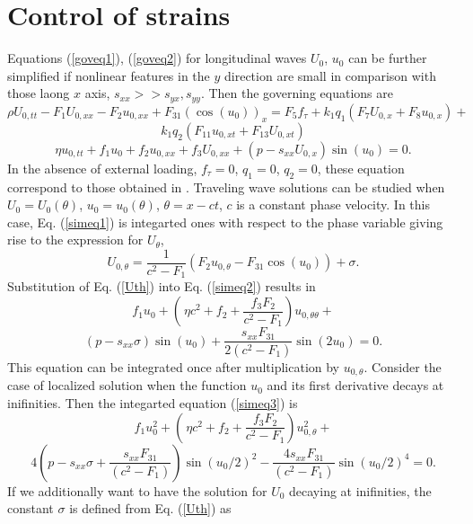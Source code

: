 \section{Control of strains}
Equations (\ref{goveq1}), (\ref{goveq2}) for longitudinal waves $U_0$, $u_0$ can be further simplified if nonlinear features in the $y$ direction are small in comparison with those laong $x$ axis, $s_{xx}>>s_{yx}, s_{yy}$. Then the governing equations are 
\[
\rho U_{0,tt}-F_1 U_{0,xx}-F_2 u_{0,xx}+F_{31} ( \cos(u_0))_x= F_5 f_\tau+k_1 q_1 (F_7 U_{0,x}+F_8 u_{0,x})+
\]
\begin{equation}
	k_1 q_2 (F_{11} u_{0,xt}+ F_{13} U_{0,xt}) \label{simeq1}
\end{equation}
\begin{equation}
	\eta u_{0,tt}+f_1 u_0+f_2 u_{0,xx}+f_3 U_{0,xx}+(p-s_{xx} U_{0,x})\sin(u_0)=0.  \label{simeq2}
\end{equation}
In the absence of external loading, $f_\tau=0$, $q_1=0$, $q_2=0$, these equation correspond to those obtained in \cite{por14}. Traveling wave solutions can be studied when $U_0=U_0(\theta)$, $u_0=u_0(\theta)$, $\theta=x- c t$, $c$ is a constant phase velocity. In this case, Eq. (\ref{simeq1}) is integarted ones with respect to the phase variable giving rise to the expression for $U_\theta$,
\begin{equation}
	U_{0,\theta}=\frac{1}{c^2-F_1}\left(F_2 u_{0,\theta}-F_{31} \cos (u_0)\right)+\sigma. \label{Uth}
\end{equation}
Substitution of Eq. (\ref{Uth}) into Eq. (\ref{simeq2}) results in
\[
f_1 u_0+\left(\frac{}{}\eta c^2+ f_2+\frac{f_3 F_2}{c^2-F_1}\right) u_{0,\theta \theta}+ 
\]
\begin{equation}
	(p-s_{xx} \sigma)\sin(u_0)+\frac{s_{xx} F_{31}}{2(c^2-F_1)}\sin (2 u_0)=0. \label{simeq3}
\end{equation}
This equation can be integrated once after multiplication by $u_{0,\theta}$. Consider the case of localized solution when the function $u_0$ and its first derivative decays at inifinities. Then the integarted equation (\ref{simeq3}) is
\[
f_1 u_0^2+\left(\frac{}{}\eta c^2+ f_2+\frac{f_3 F_2}{c^2-F_1}\right) u_{0,\theta}^2+ 
\]
\begin{equation}
	4 (p-s_{xx} \sigma+\frac{s_{xx} F_{31}}{(c^2-F_1)}) \sin(u_0/2)^2-\frac{4s_{xx} F_{31}}{(c^2-F_1)}\sin(u_0/2)^4=0.  \label{simeq4}
\end{equation}
If we additionally want to have the solution for $U_0$ decaying at inifinities, the constant $\sigma$ is defined from Eq. (\ref{Uth}) as
